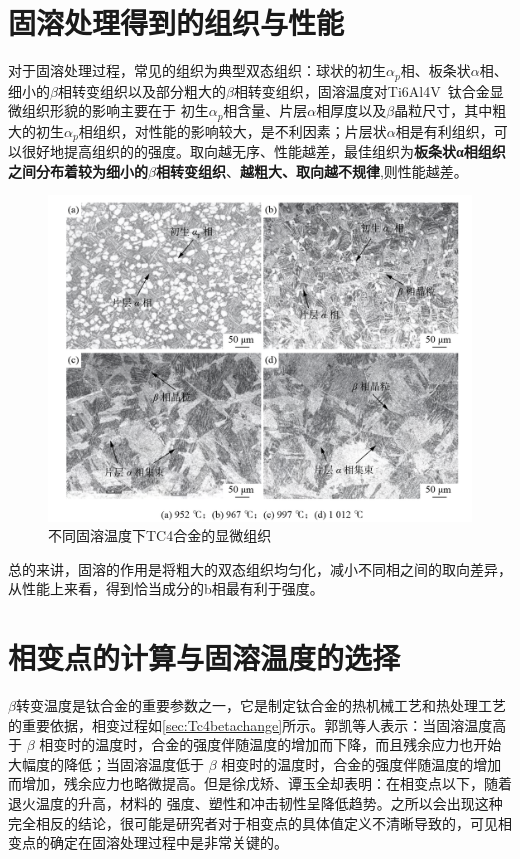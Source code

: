 \documentclass[
class = book,
zihao = -4,
font = noto,
paper = a4paper,
openany
]{easybook}
\begin{document}
\section{固溶处理得到的组织与性能}
对于固溶处理过程，常见的组织为典型双态组织：球状的初生$ \alpha_p $相、板条状$ \alpha $相、细小的$ \beta $相转变组织以及部分粗大的$ \beta $相转变组织\cite{zhanghaoyinGurongShixiaoduiTC4taihejinzuzhihelixuexingnengdeyingxiang2014}，固溶温度对Ti6Al4V 钛合金显微组织形貌的影响主要在于 初生$ \alpha_p $相含量、片层$ \alpha $相厚度以及$\beta$晶粒尺寸，其中粗大的初生$ \alpha_p $相组织，对性能的影响较大，是不利因素；片层状$ \alpha $相是有利组织，可以很好地提高组织的的强度\cite{ranxingGurongwenduduiTi6Al4VELItaihejinxianweizuzhijixingnengdeyingxiang2021}。取向越无序、性能越差，最佳组织为\textbf{板条状α相组织之间分布着较为细小的$\beta$相转变组织}、\textbf{越粗大、取向越不规律},则性能越差。
\begin{figure}[h!]
	\centering
	\includegraphics[width=0.7\linewidth]{金相_丙}
	\caption{不同固溶温度下TC4合金的显微组织}
	\label{fig:}
\end{figure}


总的来讲，固溶的作用是将粗大的双态组织均匀化，减小不同相之间的取向差异，从性能上来看，得到恰当成分的b相最有利于强度。

\section{相变点的计算与固溶温度的选择}
$\beta$转变温度是钛合金的重要参数之一，它是制定钛合金的热机械工艺和热处理工艺的重要依据，相变过程如\ref{sec:Tc4betachange}所示。郭凯\cite{guokaiTC4taihejinrechuligongyideyanjiuxianzhuangjijinzhan2021}等人表示：当固溶温度高于 $\beta$ 相变时的温度时，合金的强度伴随温度的增加而下降，而且残余应力也开始大幅度的降低；当固溶温度低于 $\beta$ 相变时的温度时，合金的强度伴随温度的增加而增加，残余应力也略微提高。但是徐戊矫、谭玉全\cite{xujianGurongshixiaogongyiduiTC4taihejinzuzhijixingnengdeyingxiang2014}却表明：在相变点以下，随着退火温度的升高，材料的 强度、塑性和冲击韧性呈降低趋势。之所以会出现这种完全相反的结论，很可能是研究者对于相变点的具体值定义不清晰导致的，可见相变点的确定在固溶处理过程中是非常关键的。
\end{document}
